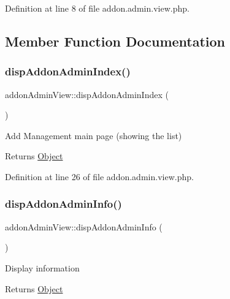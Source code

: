 Definition at line 8 of file addon.\+admin.\+view.\+php.



\subsection{Member Function Documentation}
\mbox{\label{classaddonAdminView_ac460e3c832e8209833bd5f50ab41910c}} 
\subsubsection{\texorpdfstring{disp\+Addon\+Admin\+Index()}{dispAddonAdminIndex()}}
{\footnotesize\ttfamily addon\+Admin\+View\+::disp\+Addon\+Admin\+Index (\begin{DoxyParamCaption}{ }\end{DoxyParamCaption})}

Add Management main page (showing the list)

\begin{DoxyReturn}{Returns}
\hyperlink{classObject}{Object} 
\end{DoxyReturn}


Definition at line 26 of file addon.\+admin.\+view.\+php.

\mbox{\label{classaddonAdminView_a90e6af25e34c4834bd43633da6d83b60}} 
\subsubsection{\texorpdfstring{disp\+Addon\+Admin\+Info()}{dispAddonAdminInfo()}}
{\footnotesize\ttfamily addon\+Admin\+View\+::disp\+Addon\+Admin\+Info (\begin{DoxyParamCaption}{ }\end{DoxyParamCaption})}

Display information

\begin{DoxyReturn}{Returns}
\hyperlink{classObject}{Object} 
\end{DoxyReturn}


